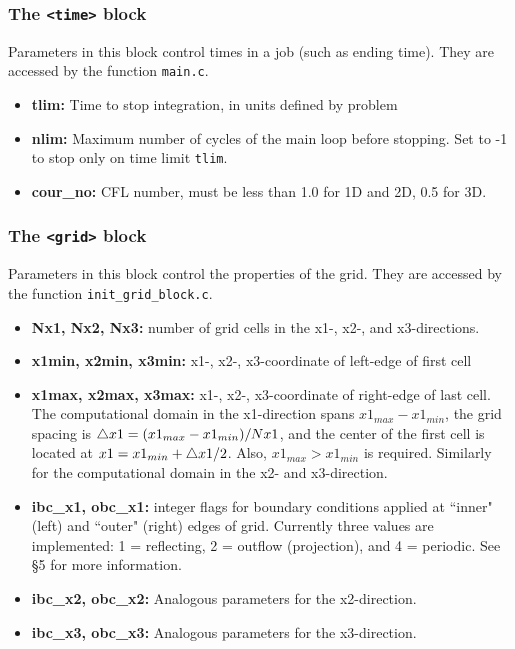 \subsubsection{The {\tt <time>} block}

Parameters in this block control times in a job (such as ending time).
They are accessed by the function {\tt main.c}.
\begin{itemize}

\item {\bf tlim:} Time to stop integration, in units defined by problem

\item {\bf nlim:} Maximum number of cycles of the main loop before stopping.
Set to -1 to stop only on time limit {\tt tlim}.

\item {\bf cour\_no:}  CFL number, must be less than 1.0 for 1D and 2D, 0.5
for 3D.

\end{itemize}

\subsubsection{The {\tt <grid>} block}

Parameters in this block control the properties of the grid. 
They are accessed by the function {\tt init\_grid\_block.c}.
\begin{itemize}

\item {\bf Nx1, Nx2, Nx3:} number of grid cells in the x1-, x2-, and x3-directions.

\item {\bf x1min, x2min, x3min:} x1-, x2-, x3-coordinate of left-edge of first cell

\item {\bf x1max, x2max, x3max:} x1-, x2-, x3-coordinate of right-edge of last cell.
The computational domain in the x1-direction spans $x1_{max}-x1_{min}$, the grid
spacing is $\bigtriangleup x1=(x1_{max}-x1_{min})/Nx1$, and the center of the
first cell is located at $x1=x1_{min} + \bigtriangleup x1/2$. Also, $x1_{max} >
x1_{min}$ is required.  Similarly for the computational domain in the 
x2- and x3-direction.

\item {\bf ibc\_x1, obc\_x1:} integer flags for boundary conditions applied
at ``inner" (left) and ``outer" (right) edges of grid.  Currently three
values are implemented: 1 = reflecting, 2 = outflow (projection), 
and 4 = periodic.  See \S 5 for more information.

\item {\bf ibc\_x2, obc\_x2:} Analogous parameters for the x2-direction.

\item {\bf ibc\_x3, obc\_x3:} Analogous parameters for the x3-direction.

\end{itemize}

